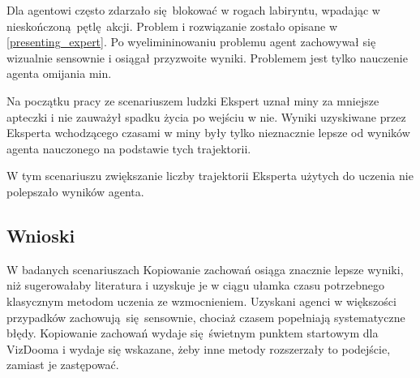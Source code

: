 Dla  agentowi często zdarzało się blokować w rogach labiryntu, wpadając w nieskończoną pętlę akcji. Problem i rozwiązanie zostało opisane w \ref{presenting_expert}. Po wyelimininowaniu problemu agent zachowywał się wizualnie sensownie i osiągał przyzwoite wyniki. Problemem jest tylko nauczenie agenta omijania min.

Na początku pracy ze scenariuszem ludzki Ekspert uznał miny za mniejsze apteczki i nie zauważył spadku życia po wejściu w nie. Wyniki uzyskiwane przez Eksperta wchodzącego czasami w miny były tylko nieznacznie lepsze od wyników agenta nauczonego na podstawie tych trajektorii.

W tym scenariuszu zwiększanie liczby trajektorii Eksperta użytych do uczenia nie polepszało wyników agenta. 

\subsection{Wnioski}
W badanych scenariuszach Kopiowanie zachowań osiąga znacznie lepsze wyniki, niż sugerowałaby literatura i uzyskuje je w ciągu ułamka czasu potrzebnego klasycznym metodom uczenia ze wzmocnieniem. Uzyskani agenci w większości przypadków zachowują się sensownie, chociaż czasem popełniają systematyczne błędy. Kopiowanie zachowań wydaje się świetnym punktem startowym dla VizDooma i wydaje się wskazane, żeby inne metody rozszerzały to podejście, zamiast je zastępować.
